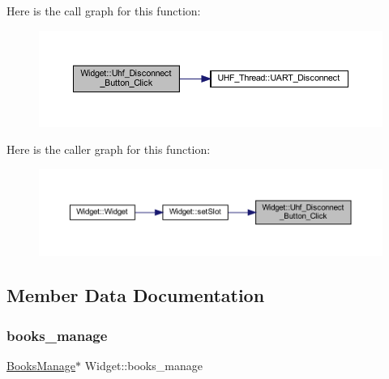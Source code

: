 Here is the call graph for this function\+:
\nopagebreak
\begin{figure}[H]
\begin{center}
\leavevmode
\includegraphics[width=350pt]{class_widget_a0186f9125495a90a0166280d932ae831_cgraph}
\end{center}
\end{figure}
Here is the caller graph for this function\+:
\nopagebreak
\begin{figure}[H]
\begin{center}
\leavevmode
\includegraphics[width=350pt]{class_widget_a0186f9125495a90a0166280d932ae831_icgraph}
\end{center}
\end{figure}


\subsection{Member Data Documentation}
\mbox{\label{class_widget_a605a0b8528b41b051ff0b8ff4fee73ed}} 
\subsubsection{\texorpdfstring{books\_manage}{books\_manage}}
{\footnotesize\ttfamily \mbox{\hyperlink{class_books_manage}{Books\+Manage}}$\ast$ Widget\+::books\+\_\+manage\hspace{0.3cm}{\ttfamily [private]}}

\mbox{\label{class_widget_a53a21a665bf0bf478e56d2605dd48d90}} 
